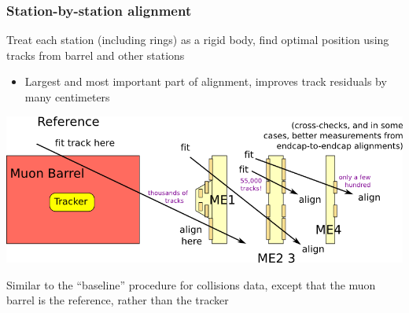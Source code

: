 \documentclass[compress]{beamer}
\begin{document}
\begin{frame}
\frametitle{Station-by-station alignment}

Treat each station (including rings) as a rigid body, find optimal
position using tracks from barrel and other stations
\begin{itemize}
\item Largest and most important part of alignment, improves track residuals by many centimeters
\end{itemize}

\vfill
\includegraphics[width=\linewidth]{fit_here_align_there.png}

\vfill Similar to the ``baseline'' procedure for collisions data,
except that the muon barrel is the reference, rather than the tracker
\end{frame}
\end{document}

